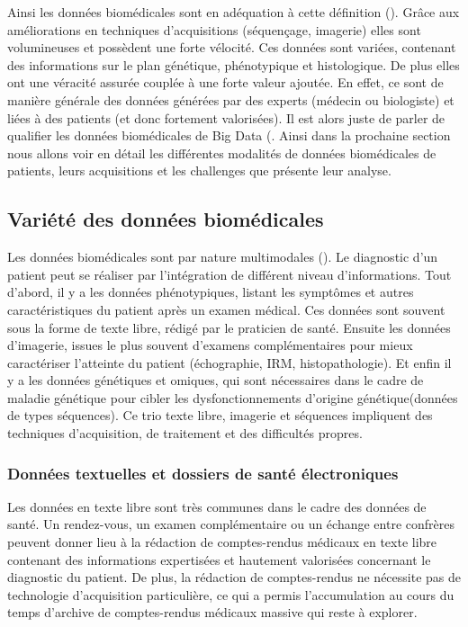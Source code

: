 Ainsi les données biomédicales sont en adéquation à cette définition (\cite{zheng_application_2021}). Grâce aux améliorations en techniques d'acquisitions (séquençage, imagerie) elles sont volumineuses et possèdent une forte vélocité. Ces données sont variées, contenant des informations sur le plan génétique, phénotypique et histologique. De plus elles ont une véracité assurée couplée à une forte valeur ajoutée. En effet, ce sont de manière générale des données générées par des experts (médecin ou biologiste) et liées à des patients (et donc fortement valorisées). Il est alors juste de parler de qualifier les données biomédicales de Big Data (\cite{sonawane_network_2019}. Ainsi dans la prochaine section nous allons voir en détail les différentes modalités de données biomédicales de patients, leurs acquisitions et les challenges que présente leur analyse.

\subsection{Variété des données biomédicales}
Les données biomédicales sont par nature multimodales (\cite{acosta_multimodal_2022}). Le diagnostic d'un patient peut se réaliser par l'intégration de différent niveau d'informations. Tout d'abord, il y a les données phénotypiques, listant les symptômes et autres caractéristiques du patient après un examen médical. Ces données sont souvent sous la forme de texte libre, rédigé par le praticien de santé. Ensuite les données d'imagerie, issues le plus souvent d'examens complémentaires pour mieux caractériser l'atteinte du patient (échographie, IRM, histopathologie). Et enfin il y a les données génétiques et omiques, qui sont nécessaires dans le cadre de maladie génétique pour cibler les dysfonctionnements d'origine génétique(données de types séquences). Ce trio texte libre, imagerie et séquences impliquent des techniques d'acquisition, de traitement et des difficultés propres.

\subsubsection{Données textuelles et dossiers de santé électroniques}
Les données en texte libre sont très communes dans le cadre des données de santé. Un rendez-vous, un examen complémentaire ou un échange entre confrères peuvent donner lieu à la rédaction de comptes-rendus médicaux en texte libre contenant des informations expertisées et hautement valorisées concernant le diagnostic du patient. De plus, la rédaction de comptes-rendus ne nécessite pas de technologie d'acquisition particulière, ce qui a permis l'accumulation au cours du temps d'archive de comptes-rendus médicaux massive qui reste à explorer.

